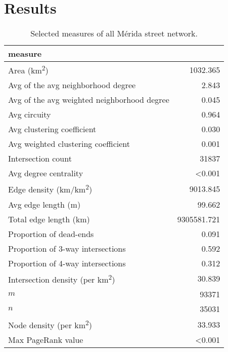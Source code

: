 \chapter{Results}
\label{cha:chapter4}

\begin{table*}[htbp]
	\centering
	\caption{Selected measures of all Mérida street network.}
	\label{tab:measures_urban_city}
	\small
	\begin{tabular}{ l r }
		\toprule
		measure                                          &              \\
		\midrule
		Area (km\textsuperscript{2})                     & 1032.365       \\
		Avg of the avg neighborhood degree               & 2.843        \\
		Avg of the avg weighted neighborhood degree      & 0.045       \\
		Avg circuity                                     & 0.964 \\
		Avg clustering coefficient                       & 0.030        \\
		Avg weighted clustering coefficient              & 0.001 \\
		Intersection count                               & 31837      \\
		Avg degree centrality                            & \textless0.001          \\
		Edge density (km/km\textsuperscript{2})          & 9013.845         \\
		Avg edge length (m)                              & 99.662          \\
		Total edge length (km)                           & 9305581.721      \\
		Proportion of dead-ends                          & 0.091          \\
		Proportion of 3-way intersections                & 0.592         \\
		Proportion of 4-way intersections                & 0.312          \\
		Intersection density (per km\textsuperscript{2}) & 30.839          \\
		$m$                                              & 93371     \\
		$n$                                              & 35031      \\
		Node density (per km\textsuperscript{2})         & 33.933         \\
		Max PageRank value                               & \textless0.001 \\

\end{tabular}
\end{table*}
